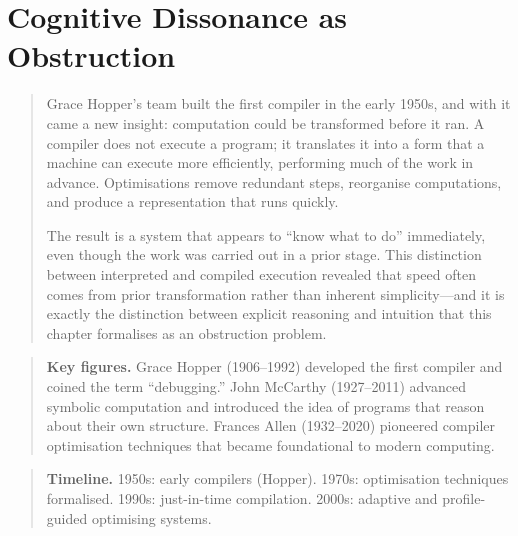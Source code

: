 \documentclass[11pt]{book}
\theoremstyle{plain}
\theoremstyle{definition}
\theoremstyle{remark}
\newenvironment{historicalpreamble}
  {\begin{quote}\small}
  {\end{quote}}
\newenvironment{historicalfigures}
  {\begin{quote}\small\textbf{Key figures.}\enspace\ignorespaces}
  {\end{quote}}
\newenvironment{paradigmtimeline}
  {\begin{quote}\small\textbf{Timeline.}\enspace\ignorespaces}
  {\end{quote}}
\begin{document}
\chapter{Cognitive Dissonance as Obstruction}

\begin{historicalpreamble}
Grace Hopper's team built the first compiler in the early 1950s, and with
it came a new insight: computation could be transformed before it ran.
A compiler does not execute a program; it translates it into a form that
a machine can execute more efficiently, performing much of the work in
advance. Optimisations remove redundant steps, reorganise computations,
and produce a representation that runs quickly.

The result is a system that appears to ``know what to do'' immediately,
even though the work was carried out in a prior stage. This distinction
between interpreted and compiled execution revealed that speed often comes
from prior transformation rather than inherent simplicity---and it is
exactly the distinction between explicit reasoning and intuition that
this chapter formalises as an obstruction problem.
\end{historicalpreamble}

\begin{historicalfigures}
Grace Hopper (1906--1992) developed the first compiler and coined the
term ``debugging.'' John McCarthy (1927--2011) advanced symbolic
computation and introduced the idea of programs that reason about their
own structure. Frances Allen (1932--2020) pioneered compiler optimisation
techniques that became foundational to modern computing.
\end{historicalfigures}

\begin{paradigmtimeline}
1950s: early compilers (Hopper). \quad
1970s: optimisation techniques formalised. \quad
1990s: just-in-time compilation. \quad
2000s: adaptive and profile-guided optimising systems.
\end{paradigmtimeline}
\end{document}

